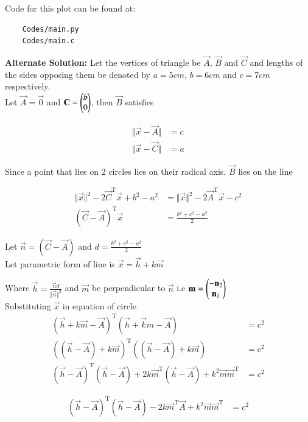 \documentclass[journal]{IEEEtran}
\begin{document}
Code for this plot can be found at:
\begin{lstlisting}
    Codes/main.py
    Codes/main.c
\end{lstlisting}

\textbf{Alternate Solution: } Let the vertices of triangle be $\vec{A}$, $\vec{B}$ and $\vec{C}$ and lengths of the sides opposing them be denoted by $a = 5cm$, $b = 6cm$ and $c = 7cm$ respectively.
\\

Let $\vec{A} = \vec{0}$ and $\mathbf{C} = \begin{pmatrix}b \\ 0\end{pmatrix}$, then $\vec{B}$ satisfies

\begin{align*}
	\Vert \vec{x} - \vec{A} \Vert &= c\\
	\Vert \vec{x} - \vec{C} \Vert &= a
\end{align*}

Since a point that lies on 2 circles lies on their radical axis, $\vec{B}$ lies on the line

\begin{align*}
	\Vert \vec{x}\Vert^2 - 2\vec{C}^\text{T}\vec{x} + b^2 - a^2 &= \Vert \vec{x}\Vert^2 - 2\vec{A}^\text{T}\vec{x} - c^2 \\
	(\vec{C}-\vec{A})^\text{T}\vec{x} &= \frac{b^2 + c^2 - a^2}{2}
\end{align*}

Let $\vec{n} = (\vec{C} - \vec{A})$ and $d = \frac{b^2 + c^2 - a^2}{2}$
\\

Let parametric form of line is $\vec{x} = \vec{h} + k\vec{m}$

Where $\vec{h} = \frac{\vec{n}d}{\Vert \vec{n} \Vert^2}$ and $\vec{m}$ be perpendicular to $\vec{n}$ i.e $\mathbf{m} = \begin{pmatrix}-\mathbf{n}_2 \\ \mathbf{n}_1\end{pmatrix}$
\\

Substituting $\vec{x}$ in equation of circle
\begin{align*}
	(\vec{h} + k\vec{m} - \vec{A})^\text{T} (\vec{h} + \vec{k}m - \vec{A}) &= c^2\\
	((\vec{h} - \vec{A}) + k\vec{m})^\text{T} ((\vec{h} - \vec{A}) + k\vec{m}) &= c^2\\
	(\vec{h} - \vec{A})^\text{T}(\vec{h} - \vec{A}) + 2k\vec{m}^\text{T}(\vec{h} - \vec{A}) + k^2\vec{m}\vec{m}^\text{T} &= c^2
\end{align*}

\begin{align*}
	(\vec{h} - \vec{A})^\text{T}(\vec{h} - \vec{A}) - 2k\vec{m}^\text{T}\vec{A} + k^2\vec{m}\vec{m}^\text{T} &= c^2	
\end{align*}
\end{document}
